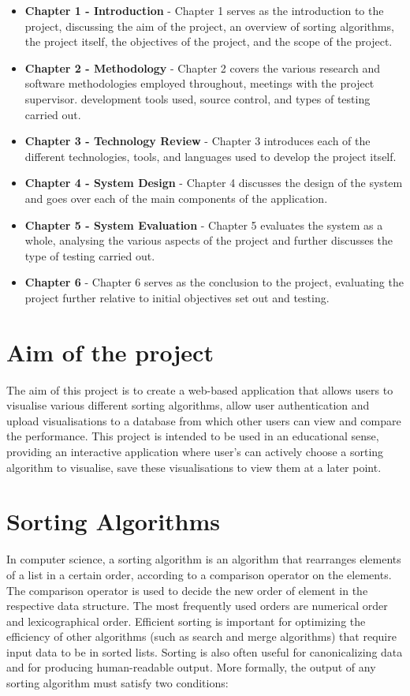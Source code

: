 \begin{itemize}
    \item \textbf{Chapter 1 - Introduction} - Chapter 1 serves as the introduction to the project, discussing the aim of the project, an overview of sorting algorithms, the project itself, the objectives of the project, and the scope of the project.
    \item \textbf{Chapter 2 - Methodology} - Chapter 2 covers the various research and software methodologies employed throughout, meetings with the project supervisor. development tools used, source control, and types of testing carried out.
    \item \textbf{Chapter 3 - Technology Review} - Chapter 3 introduces each of the different technologies, tools, and languages used to develop the project itself.
    \item \textbf{Chapter 4 - System Design} - Chapter 4 discusses the design of the system and goes over each of the main components of the application.
    \item \textbf{Chapter 5 - System Evaluation} - Chapter 5 evaluates the system as a whole, analysing the various aspects of the project and further discusses the type of testing carried out.
    \item \textbf{Chapter 6} - Chapter 6 serves as the conclusion to the project, evaluating the project further relative to initial objectives set out and testing.
\end{itemize}

\section{Aim of the project}
The aim of this project is to create a web-based application that allows users to
visualise various different sorting algorithms, allow user authentication and 
upload visualisations to a database from which other users can view and compare
the performance. This project is intended to be used in an educational sense,
providing an interactive application where user's can actively choose a sorting
algorithm to visualise, save these visualisations to view them at a later point.

\section{Sorting Algorithms}
In computer science, a sorting algorithm is an algorithm that rearranges 
elements of a list in a certain order, according to a comparison operator on the
elements. The comparison operator is used to decide the new order of element in the respective data structure. The most frequently used orders are numerical order and lexicographical order. Efficient sorting is important for optimizing the efficiency of other algorithms (such as search and merge algorithms) that require input data to be in sorted lists. Sorting is also often useful for canonicalizing data and for producing human-readable output. More formally, the output of any sorting algorithm must satisfy two conditions:


